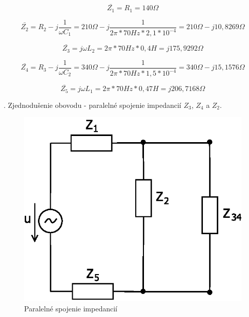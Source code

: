 \documentclass[a4paper,12pt]{article}
\begin{document}
\newpage
\begin{equation}
\bar{Z_1} = R_1 = 140\Omega
\end{equation}

\begin{equation}
\bar{Z_2} = R_2 - j\frac{1}{\omega C_1} = 210\Omega -j\frac{1}{2\pi * 70Hz * 2,1*10^{-4}} = 210\Omega - j10,8269\Omega
\end{equation}

\begin{equation}
\bar{Z_3} = j\omega L_2 = 2\pi * 70Hz * 0,4H = j175,9292\Omega
\end{equation}

\begin{equation}
\bar{Z_4} = R_3 - j\frac{1}{\omega C_2} = 340\Omega -j\frac{1}{2\pi * 70Hz * 1,5*10^{-4}} = 340\Omega - j15,1576\Omega
\end{equation}

\begin{equation}
\bar{Z_5} = j\omega L_1 = 2\pi * 70Hz * 0,47H = j206,7168\Omega
\end{equation}

\bigskip
{}. Zjednodušenie obovodu - paralelné spojenie impedancií $Z_3$, $Z_4$ a $Z_2$.
\begin{figure}[!htb]
\centering
\includegraphics[scale=1.0]{p4/p2.eps}
\caption{Paralelné spojenie impedancií}
\end{figure}
\end{document}

